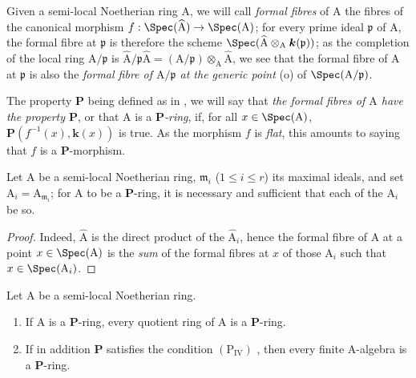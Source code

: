 \begin{env}[7.3.13]
\label{IV.7.3.13}
Given a semi-local Noetherian ring $\mathrm{A}$, we will call \emph{formal fibres} of $\mathrm{A}$ the fibres of the canonical morphism $f:\Spec(\widehat{\mathrm{A}})\to\Spec(\mathrm{A})$; for every prime ideal $\mathfrak{p}$ of $\mathrm{A}$, the formal fibre at $\mathfrak{p}$ is therefore the scheme $\Spec(\widehat{\mathrm{A}}\otimes_\mathrm{A}\boldsymbol{k}(\mathfrak{p}))$; as the completion of the local ring $\mathrm{A}/\mathfrak{p}$ is $\widehat{\mathrm{A}}/\mathfrak{p}\widehat{\mathrm{A}}=(\mathrm{A}/\mathfrak{p})\otimes_\mathrm{A}\widehat{\mathrm{A}}$, we see that the formal fibre of $\mathrm{A}$ at $\mathfrak{p}$ is also the \emph{formal fibre of $\mathrm{A}/\mathfrak{p}$ at the generic point} (o) of $\Spec(\mathrm{A}/\mathfrak{p})$.
\end{env}


The property $\boldsymbol{P}$ being defined as in , we will say that \emph{the formal fibres of $\mathrm{A}$ have the property $\boldsymbol{P}$}, or that $\mathrm{A}$ is a \emph{$\boldsymbol{P}$-ring}, if, for all $x\in\Spec(\mathrm{A})$, $\boldsymbol{P}(f^{-1}(x),\boldsymbol{k}(x))$ is true.
As the morphism $f$ is \emph{flat}, this amounts to saying that $f$ is a $\boldsymbol{P}$-morphism.

\begin{proposition}[7.3.14]
\label{IV.7.3.14}
Let $\mathrm{A}$ be a semi-local Noetherian ring, $\mathfrak{m}_i$ ($1\leqslant i\leqslant r$) its maximal ideals, and set $\mathrm{A}_i=\mathrm{A}_{\mathfrak{m}_i}$; for $\mathrm{A}$ to be a $\boldsymbol{P}$-ring, it is necessary and sufficient that each of the $\mathrm{A}_i$ be so.
\end{proposition}

\begin{proof}
Indeed, $\widehat{\mathrm{A}}$ is the direct product of the $\widehat{\mathrm{A}}_i$, hence the formal fibre of $\mathrm{A}$ at a point $x\in\Spec(\mathrm{A})$ is the \emph{sum} of the formal fibres at $x$ of those $\mathrm{A}_i$ such that $x\in\Spec(\mathrm{A}_i)$.
\end{proof}

\begin{proposition}[7.3.15]
\label{IV.7.3.15}
Let $\mathrm{A}$ be a semi-local Noetherian ring.
\begin{enumerate}[label=\emph{\roman*)}]
  \item If $\mathrm{A}$ is a $\boldsymbol{P}$-ring, every quotient ring of $\mathrm{A}$ is a $\boldsymbol{P}$-ring.
  \item If in addition $\boldsymbol{P}$ satisfies the condition $(\mathrm{P_{IV}})$ , then every finite A-algebra is a $\boldsymbol{P}$-ring.
\end{enumerate}
\end{proposition}

